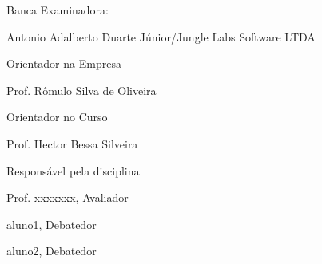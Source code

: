 
%
% 
%
\begin{folhadeaprovacao}


\thispagestyle{empty}

{\large Banca Examinadora:}

\vspace{1.3cm}

\begin{flushright}

{\large Antonio Adalberto Duarte Júnior/Jungle Labs Software LTDA}

{\large Orientador na Empresa}

\vspace{1.2cm}
{\large Prof. Rômulo Silva de Oliveira}

{\large Orientador no Curso}

\vspace{1.2cm}
 
{\large Prof. Hector Bessa Silveira}

{\large Responsável pela disciplina}

\vspace{1cm}

{\large Prof. xxxxxxx, Avaliador}

\vspace{0.8cm}

{\large aluno1, Debatedor}

\vspace{0.8cm}

{\large aluno2, Debatedor}

\end{flushright}
  
\end{folhadeaprovacao}
